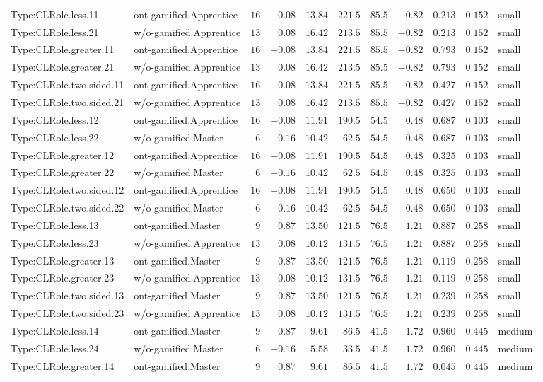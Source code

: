 \documentclass[6pt,a4paper]{article}
\begin{document}
{\begin{longtable}{llrrrrrrrrl}
Type:CLRole.less.11&ont-gamified.Apprentice&$16$&$-0.08$&$13.84$&$221.5$&$ 85.5$&$-0.82$&$0.213$&$0.152$&small\tabularnewline
Type:CLRole.less.21&w/o-gamified.Apprentice&$13$&$ 0.08$&$16.42$&$213.5$&$ 85.5$&$-0.82$&$0.213$&$0.152$&small\tabularnewline
Type:CLRole.greater.11&ont-gamified.Apprentice&$16$&$-0.08$&$13.84$&$221.5$&$ 85.5$&$-0.82$&$0.793$&$0.152$&small\tabularnewline
Type:CLRole.greater.21&w/o-gamified.Apprentice&$13$&$ 0.08$&$16.42$&$213.5$&$ 85.5$&$-0.82$&$0.793$&$0.152$&small\tabularnewline
Type:CLRole.two.sided.11&ont-gamified.Apprentice&$16$&$-0.08$&$13.84$&$221.5$&$ 85.5$&$-0.82$&$0.427$&$0.152$&small\tabularnewline
Type:CLRole.two.sided.21&w/o-gamified.Apprentice&$13$&$ 0.08$&$16.42$&$213.5$&$ 85.5$&$-0.82$&$0.427$&$0.152$&small\tabularnewline
Type:CLRole.less.12&ont-gamified.Apprentice&$16$&$-0.08$&$11.91$&$190.5$&$ 54.5$&$ 0.48$&$0.687$&$0.103$&small\tabularnewline
Type:CLRole.less.22&w/o-gamified.Master&$ 6$&$-0.16$&$10.42$&$ 62.5$&$ 54.5$&$ 0.48$&$0.687$&$0.103$&small\tabularnewline
Type:CLRole.greater.12&ont-gamified.Apprentice&$16$&$-0.08$&$11.91$&$190.5$&$ 54.5$&$ 0.48$&$0.325$&$0.103$&small\tabularnewline
Type:CLRole.greater.22&w/o-gamified.Master&$ 6$&$-0.16$&$10.42$&$ 62.5$&$ 54.5$&$ 0.48$&$0.325$&$0.103$&small\tabularnewline
Type:CLRole.two.sided.12&ont-gamified.Apprentice&$16$&$-0.08$&$11.91$&$190.5$&$ 54.5$&$ 0.48$&$0.650$&$0.103$&small\tabularnewline
Type:CLRole.two.sided.22&w/o-gamified.Master&$ 6$&$-0.16$&$10.42$&$ 62.5$&$ 54.5$&$ 0.48$&$0.650$&$0.103$&small\tabularnewline
Type:CLRole.less.13&ont-gamified.Master&$ 9$&$ 0.87$&$13.50$&$121.5$&$ 76.5$&$ 1.21$&$0.887$&$0.258$&small\tabularnewline
Type:CLRole.less.23&w/o-gamified.Apprentice&$13$&$ 0.08$&$10.12$&$131.5$&$ 76.5$&$ 1.21$&$0.887$&$0.258$&small\tabularnewline
Type:CLRole.greater.13&ont-gamified.Master&$ 9$&$ 0.87$&$13.50$&$121.5$&$ 76.5$&$ 1.21$&$0.119$&$0.258$&small\tabularnewline
Type:CLRole.greater.23&w/o-gamified.Apprentice&$13$&$ 0.08$&$10.12$&$131.5$&$ 76.5$&$ 1.21$&$0.119$&$0.258$&small\tabularnewline
Type:CLRole.two.sided.13&ont-gamified.Master&$ 9$&$ 0.87$&$13.50$&$121.5$&$ 76.5$&$ 1.21$&$0.239$&$0.258$&small\tabularnewline
Type:CLRole.two.sided.23&w/o-gamified.Apprentice&$13$&$ 0.08$&$10.12$&$131.5$&$ 76.5$&$ 1.21$&$0.239$&$0.258$&small\tabularnewline
Type:CLRole.less.14&ont-gamified.Master&$ 9$&$ 0.87$&$ 9.61$&$ 86.5$&$ 41.5$&$ 1.72$&$0.960$&$0.445$&medium\tabularnewline
Type:CLRole.less.24&w/o-gamified.Master&$ 6$&$-0.16$&$ 5.58$&$ 33.5$&$ 41.5$&$ 1.72$&$0.960$&$0.445$&medium\tabularnewline
Type:CLRole.greater.14&ont-gamified.Master&$ 9$&$ 0.87$&$ 9.61$&$ 86.5$&$ 41.5$&$ 1.72$&$0.045$&$0.445$&medium\tabularnewline

\end{longtable}}
\end{document}
